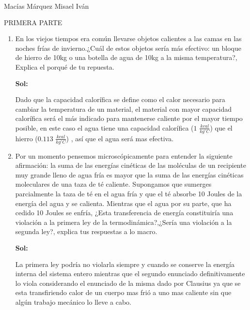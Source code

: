 \documentclass[12pt,a4paper]{article}
\begin{document}
Macías Márquez Misael Iván

PRIMERA PARTE

\begin{enumerate}






\item En los viejos tiempos era común llevarse objetos calientes a las camas en las noches frías de invierno.¿Cuál de estos objetos sería más efectivo: un bloque de hierro de 10kg o una botella de agua de 10kg a la misma temperatura?, Explica el porqué de tu repuesta.

\textbf{Sol:}

Dado que la capacidad calorífica se define como el calor necesario para cambiar la temperatura de un material, el material con mayor capacidad calorífica será el  más indicado para mantenerse caliente por el mayor tiempo posible, en este caso el agua tiene una capacidad calorífica ($1$ $\frac{kcal}{kg^{\circ} C}$) que el hierro ($0.113$ $\frac{kcal}{kg^{\circ} C}$) , así que el agua será mas efectiva.






\item Por un momento pensemos microscópicamente para entender la siguiente afirmación: la suma de las energías cinéticas de las moléculas de un recipiente muy grande lleno de agua fría es mayor que la suma de las energías cinéticas moleculares de una taza de té caliente. Supongamos que sumerges parcialmente la taza de té en el agua fría y que el té absorbe 10 Joules de la energía del agua y se calienta. Mientras que el agua por su parte, que ha cedido 10 Joules se enfría, ¿Esta transferencia de energía constituiría una violación a la primera ley de la termodinámica?,¿Sería una violación a la segunda ley?, explica tus respuestas a lo macro.

\textbf{Sol:}

La primera ley podría no violarla siempre y cuando se conserve la energía interna del sistema entero mientras que el segundo enunciado definitivamente lo viola considerando el enunciado de la misma dado por Clausius ya que se esta transfiriendo calor de un cuerpo mas frió a uno mas caliente sin que algún trabajo mecánico lo lleve a cabo.








\end{enumerate}
\end{document}
